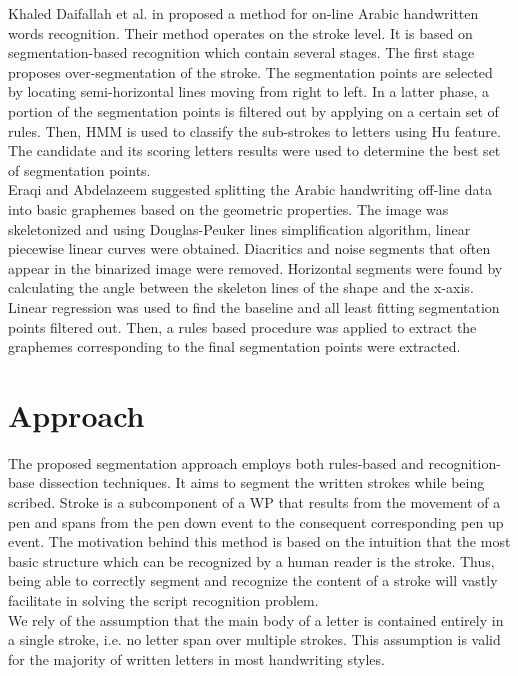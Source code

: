 \documentclass[journal,compsoc]{IEEEtran}
\begin{document}
Khaled Daifallah et al. in \cite{daifallah2009recognition} proposed a method for on-line Arabic handwritten words recognition. Their method operates on the stroke level. It is based on segmentation-based recognition which contain several stages. The first stage proposes over-segmentation of the stroke. The segmentation points are selected by locating semi-horizontal lines moving from right to left. In a latter phase, a portion of the segmentation points is filtered out by applying on a certain set of rules. Then, HMM is used to classify the sub-strokes to letters using Hu feature. The candidate and its scoring letters results were used to determine the best set of segmentation points. \\

Eraqi and Abdelazeem \cite{eraqi2012new} suggested splitting the Arabic handwriting off-line data into basic graphemes based on the geometric properties. The image was skeletonized and using Douglas-Peuker lines simplification algorithm, linear piecewise linear curves were obtained. Diacritics and noise segments that often appear in the binarized image were removed. Horizontal segments were found by calculating the angle between the skeleton lines of the shape and the x-axis. Linear regression was used to find the baseline and all least fitting segmentation points filtered out. Then, a rules based procedure was applied to extract the graphemes corresponding to the final segmentation points were extracted.    

\newpage

\section{Approach}
\label{sec:approach}
The proposed segmentation approach employs both rules-based and recognition-base dissection techniques. It aims to segment the written strokes while being scribed. Stroke is a subcomponent of a WP that results from the movement of a pen and spans from the pen down event to the consequent corresponding pen up event. The motivation behind this method is based on the intuition that the most basic structure which can be recognized by a human reader is the stroke. Thus, being able to correctly segment and recognize the content of a stroke will vastly facilitate in solving the script recognition problem. \\

We rely of the assumption that the main body of a letter is contained entirely in a single stroke, i.e. no letter span over multiple strokes. This assumption is valid for the majority of written letters in most handwriting styles.\\ 
\end{document}
